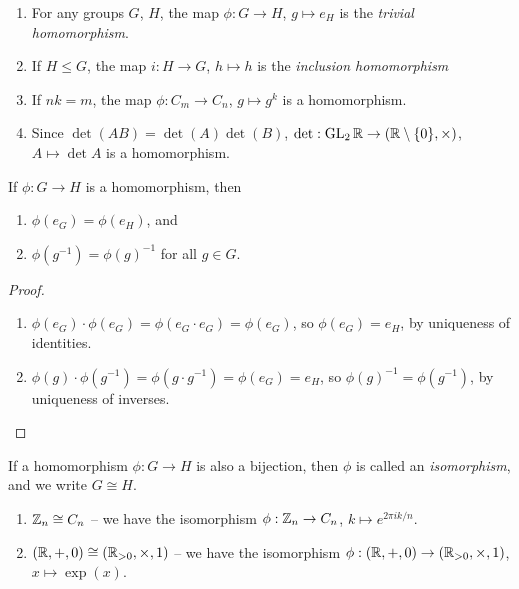 \documentclass{../../template/note}
\begin{document}
    \begin{example*}
        \begin{enumerate}[label=\protect\circled{\arabic*}]
            \item For any groups \(G\), \(H\), the map \(\phi: G \to H\), \(g \mapsto e_H\) is the \emph{trivial homomorphism}.
            \item If \(H \leq G\), the map \(i: H \to G\), \(h \mapsto h\) is the \emph{inclusion homomorphism}
            \item If \(nk = m\), the map \(\phi: C_m \to C_n\), \(g \mapsto g^k\) is a homomorphism.
            \item Since \(\det(AB) = \det(A) \det(B)\), \(\det: \operatorname{GL}_2 \mathbb R \to (\mathbb R \setminus \{0\}, \times)\), \(A \mapsto \det A\) is a homomorphism.
        \end{enumerate}
    \end{example*}
    
    \begin{lemma}
        If \(\phi: G \to H\) is a homomorphism, then
        \begin{enumerate}
            \item \(\phi(e_G) = \phi(e_H)\), and
            \item \(\phi(g^{-1}) = \phi(g)^{-1}\) for all \(g \in G\).
        \end{enumerate}
        \label{homomorphism-identity-inverse}   
    \end{lemma}
    
    \begin{proof}
        \begin{enumerate}
            \item \(\phi(e_G) \cdot \phi(e_G) = \phi(e_G \cdot e_G) = \phi(e_G)\), so \(\phi(e_G) = e_H\), by uniqueness of identities.
            \item \(\phi(g) \cdot \phi(g^{-1}) = \phi(g \cdot g^{-1}) = \phi(e_G) = e_H\), so \(\phi(g)^{-1} = \phi(g^{-1})\), by uniqueness of inverses.
        \end{enumerate}        
    \end{proof}
    
    \begin{definition}[Isomorphisms]
        If a homomorphism \(\phi: G \to H\) is also a bijection, then \(\phi\) is called an \emph{isomorphism}, and we write \(G \cong H\).
    \end{definition}
    
    \begin{example*}
        \begin{enumerate}
            \item \(\mathbb Z_n \cong C_n\) -- we have the isomorphism \(\phi: \mathbb Z_n \to C_n\), \(k \mapsto e^{2\pi i k /n}\).
            \item \((\mathbb R, +, 0) \cong (\mathbb R_{> 0}, \times, 1)\) -- we have the isomorphism \(\phi: (\mathbb R, +, 0) \to (\mathbb R_{> 0}, \times, 1)\), \(x \mapsto \exp(x)\).
        \end{enumerate}
    \end{example*}
    
\end{document}
